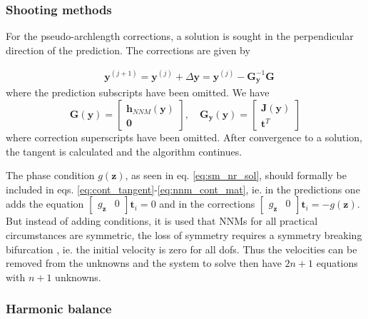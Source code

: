\subsubsection{Shooting methods}
\label{sec:shooting_cont}

For the pseudo-archlength corrections, a solution is sought in the perpendicular
direction of the prediction. The corrections are given by

\begin{equation}
  \label{eq:nnm_cont_corr}
  \begin{aligned}
    &\bm y^{(j+1)} = \bm y^{(j)} + \Delta \bm y =
    \bm y^{(j)} -\bm G^{-1}_{\bm y} \bm G
  \end{aligned}
\end{equation}
where the prediction subscripts have been omitted. We have
\begin{equation}
  \label{eq:nnm_cont_mat}
    \bm G(\bm y) =
      \begin{bmatrix}
      \bm h_{NNM}(\bm y) \\ \bm 0
    \end{bmatrix}, \quad
    \bm G_{\bm y}(\bm y) =
    \begin{bmatrix}
      \bm J(\bm y) \\ \bm t^T
    \end{bmatrix}
  \end{equation}
where correction superscripts have been omitted. After convergence to a
solution, the tangent is calculated and the algorithm continues.

The phase condition $g(\bm z)$, as seen in eq. \eqref{eq:sm_nr_sol}, should
formally be included in eqs. \eqref{eq:cont_tangent}-\eqref{eq:nnm_cont_mat},
ie. in the predictions one adds the equation $ \begin{bmatrix}g_{\bm z} &
  0 \end{bmatrix} \bm t_i = 0 $ and in the corrections $ \begin{bmatrix}g_{\bm
    z} & 0 \end{bmatrix} \bm t_i = - g(\bm z) $. But instead of adding
conditions, it is used that NNMs for all practical circumstances are symmetric,
the loss of symmetry requires a symmetry breaking bifurcation
\autocite{kerschen2009b}, ie. the initial velocity is zero for all dofs. Thus
the velocities can be removed from the unknowns and the system to solve then
have $2n+1$ equations with $n+1$ unknowns.


\subsubsection{Harmonic balance}
\label{sec:hb_cont}

